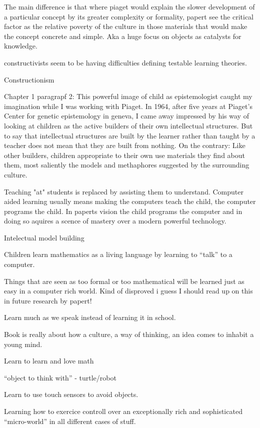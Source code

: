 The main difference is that where piaget would explain the slower development of a particular concept by its greater complexity or formality, papert see the critical factor as the relative poverty of the culture in those materials that would make the concept concrete and simple. Aka a huge focus on objects as catalysts for knowledge.

constructivists seem to be having difficulties defining testable learning theories.

Constructionism

Chapter 1 paragrapf 2:
This powerful image of child as epistemologist caught my imagination while I was working with Piaget. In 1964, after five years at Piaget's Center for genetic epistemology in geneva, I came away impressed by his way of looking at children as the active builders of their own intellectual structures. But to say that intellectual structures are built by the learner rather than taught by a teacher does not mean that they are built from nothing. On the contrary: Like other builders, children appropriate to their own use materials they find about them, most saliently the models and methaphores suggested by the surrounding culture. 

Teaching "at" students is replaced by assisting them to understand. Computer aided learning usually means making the computers teach the child, the computer programs the child. In paperts vision the child programs the computer and in doing so aquires a scence of mastery over a modern powerful technology.

Intelectual model building

Children learn mathematics as a living language by learning to "`talk"' to a computer.

Things that are seen as too formal or too mathematical will be learned just as easy in a computer rich world. Kind of disproved i guess I should read up on this in future research by papert!

Learn much as we speak instead of learning it in school.

Book is really about how a culture, a way of thinking, an idea comes to inhabit a young mind.

Learn to learn and love math

"`object to think with"' - turtle/robot

Learn to use touch sensors to avoid objects. 

Learning how to exercice controll over an exceptionally rich and sophisticated "`micro-world"' in all different cases of stuff.

